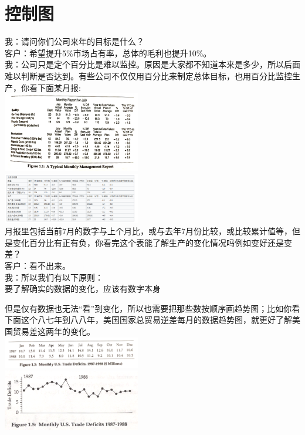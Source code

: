 \chapter{控制图} %

我：请问你们公司来年的目标是什么？\\
客户：希望提升5\%市场占有率，总体的毛利也提升10\%。\\
我：公司只是定个百分比是难以监控。原因是大家都不知道本来是多少，所以后面难以判断是否达到。有些公司不仅仅用百分比来制定总体目标，也用百分比监控生产，你看下面某月报:\\
\includegraphics[width=6cm]{The_key_fig111.png}\\

\includegraphics[width=6cm]{Screenshotfrom2023-02-1703-04-26.png}\\

月报里包括当前7月的数字与上个月比，或与去年7月份比较，或比较累计值等，但是变化百分比有正有负，你看完这个表能了解生产的变化情况吗例如变好还是变差？\\
客户：看不出来。\\
我：所以我们有以下原则：\\
要了解确实的数据的变化，应该有数字本身

但是仅有数据也无法``看''到变化，所以也需要把那些数按顺序画趋势图；比如你看下面这个八七年到八八年，美国国家总贸易逆差每月的数据趋势图，就更好了解美国贸易差这两年的变化。\\
\includegraphics[width=6cm]{The_key_fig131.png}\\
\includegraphics[width=6cm]{The_key_fig151.png}\\


